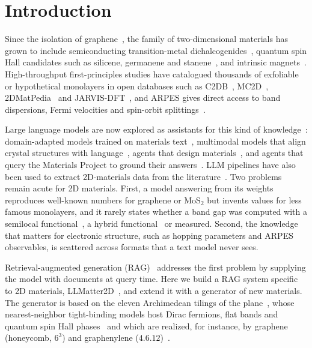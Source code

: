 \documentclass[prmaterials,twocolumn,superscriptaddress,longbibliography,nofootinbib]{revtex4-2}
\begin{document}
\section{Introduction}

Since the isolation of graphene~\cite{Novoselov2004,CastroNeto2009}, the family of
two-dimensional materials has grown to include semiconducting transition-metal
dichalcogenides~\cite{Mak2010}, quantum spin Hall candidates such as silicene, germanene
and stanene~\cite{KaneMele2005,Liu2011,Xu2013}, and intrinsic magnets~\cite{Huang2017}.
High-throughput first-principles studies have catalogued thousands of exfoliable or
hypothetical monolayers in open databases such as
C2DB~\cite{Haastrup2018,Gjerding2021}, MC2D~\cite{Mounet2018,Campi2023},
2DMatPedia~\cite{Zhou2019} and JARVIS-DFT~\cite{Choudhary2020}, and ARPES gives direct
access to band dispersions, Fermi velocities and spin-orbit splittings~\cite{Damascelli2003}.

Large language models are now explored as assistants for this kind of
knowledge~\cite{Lei2024,Oche2025}: domain-adapted models trained on materials
text~\cite{Mishra2024}, multimodal models that align crystal structures with
language~\cite{Tang2025}, agents that design materials~\cite{Jia2024}, and agents that query
the Materials Project to ground their answers~\cite{Chiang2024}. LLM pipelines have also
been used to extract 2D-materials data from the literature~\cite{Shang2025}. Two problems
remain acute for 2D materials. First, a model answering from its weights reproduces
well-known numbers for graphene or MoS$_2$ but invents values for less famous monolayers,
and it rarely states whether a band gap was computed with a semilocal
functional~\cite{PBE1996}, a hybrid functional~\cite{HSE2003} or measured. Second, the
knowledge that matters for electronic structure, such as hopping parameters and
ARPES observables, is scattered across formats that a text model never sees.

Retrieval-augmented generation (RAG)~\cite{Lewis2020} addresses the first problem by
supplying the model with documents at query time. Here we build a RAG system specific to 2D
materials, LLMatter2D~\cite{LLMatter2D}, and extend it with a generator of new materials.
The generator is based on the eleven Archimedean tilings of the
plane~\cite{Grunbaum1987}, whose nearest-neighbor tight-binding models host Dirac fermions,
flat bands and quantum spin Hall phases~\cite{CrastoDeLima2019} and which are realized, for
instance, by graphene (honeycomb, $6^3$) and graphenylene ($4.6.12$)~\cite{Song2013}.
\end{document}
